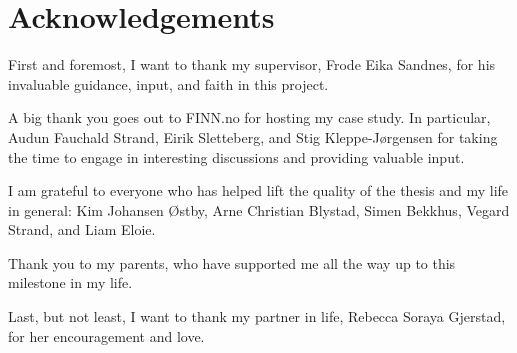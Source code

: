\chapter*{Acknowledgements}

First and foremost, I want to thank my supervisor, Frode Eika Sandnes, for his invaluable guidance, input, and faith in this project.

A big thank you goes out to FINN.no for hosting my case study. In particular, Audun Fauchald Strand, Eirik Sletteberg, and Stig Kleppe-Jørgensen for taking the time to engage in interesting discussions and providing  valuable input.

I am grateful to everyone who has helped lift the quality of the thesis and my life in general: Kim Johansen Østby, Arne Christian Blystad, Simen Bekkhus, Vegard Strand, and Liam Eloie.

Thank you to my parents, who have supported me all the way up to this milestone in my life.

Last, but not least, I want to thank my partner in life, Rebecca Soraya Gjerstad, for her encouragement and love.
